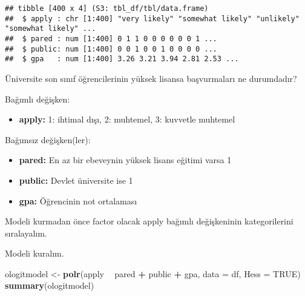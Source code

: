 \documentclass[
]{book}
\newenvironment{Shaded}{\begin{snugshade}}{\end{snugshade}}
\newcommand{\DataTypeTok}[1]{\textcolor[rgb]{0.13,0.29,0.53}{#1}}
\newcommand{\KeywordTok}[1]{\textcolor[rgb]{0.13,0.29,0.53}{\textbf{#1}}}
\newcommand{\NormalTok}[1]{#1}
\newcommand{\OperatorTok}[1]{\textcolor[rgb]{0.81,0.36,0.00}{\textbf{#1}}}
\newcommand{\OtherTok}[1]{\textcolor[rgb]{0.56,0.35,0.01}{#1}}
\newcommand{\StringTok}[1]{\textcolor[rgb]{0.31,0.60,0.02}{#1}}
\providecommand{\tightlist}{%
  \setlength{\itemsep}{0pt}\setlength{\parskip}{0pt}}
\begin{document}
\begin{verbatim}
## tibble [400 x 4] (S3: tbl_df/tbl/data.frame)
##  $ apply : chr [1:400] "very likely" "somewhat likely" "unlikely" "somewhat likely" ...
##  $ pared : num [1:400] 0 1 1 0 0 0 0 0 0 1 ...
##  $ public: num [1:400] 0 0 1 0 0 1 0 0 0 0 ...
##  $ gpa   : num [1:400] 3.26 3.21 3.94 2.81 2.53 ...
\end{verbatim}

Üniversite son sınıf öğrencilerinin yüksek lisansa başvurmaları ne durumdadır?

Bağımlı değişken:

\begin{itemize}
\tightlist
\item
  \textbf{apply:} 1: ihtimal dışı, 2: muhtemel, 3: kuvvetle muhtemel
\end{itemize}

Bağımsız değişken(ler):

\begin{itemize}
\item
  \textbf{pared:} En az bir ebeveynin yüksek lisans eğitimi varsa 1
\item
  \textbf{public:} Devlet üniversite ise 1
\item
  \textbf{gpa:} Öğrencinin not ortalaması
\end{itemize}

Modeli kurmadan önce factor olacak apply bağımlı değişkeninin kategorilerini sıralayalım.

\begin{Shaded}
\end{Shaded}

Modeli kuralım.

\begin{Shaded}
\begin{Highlighting}[]
\NormalTok{ologitmodel <-}\StringTok{ }\KeywordTok{polr}\NormalTok{(apply }\OperatorTok{~}\StringTok{ }\NormalTok{pared }\OperatorTok{+}\StringTok{ }\NormalTok{public }\OperatorTok{+}\StringTok{ }\NormalTok{gpa, }\DataTypeTok{data =}\NormalTok{ df, }\DataTypeTok{Hess =} \OtherTok{TRUE}\NormalTok{)}
\KeywordTok{summary}\NormalTok{(ologitmodel)}
\end{Highlighting}
\end{Shaded}
\end{document}
